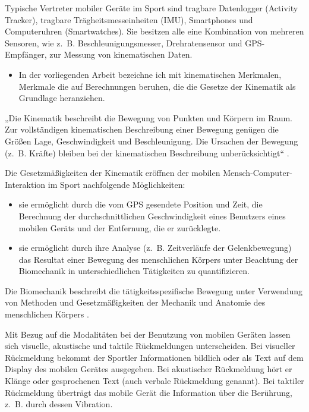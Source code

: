 Typische Vertreter mobiler Geräte im Sport sind tragbare Datenlogger (Activity Tracker), tragbare Trägheitsmesseinheiten (\ac{IMU}), Smartphones und Computeruhren (Smartwatches). Sie besitzen alle eine Kombination von mehreren Sensoren, wie z.~B. Beschleunigungsmesser, Drehratensensor und \ac{GPS}-Empfänger, zur Messung von kinematischen Daten. 
\begin{itemize}
	
	\item In der vorliegenden Arbeit bezeichne ich mit kinematischen Merkmalen, Merkmale die auf Berechnungen beruhen, die die Gesetze der Kinematik als Grundlage heranziehen.
\end{itemize}

„Die Kinematik beschreibt die Bewegung von Punkten und Körpern im Raum. Zur vollständigen kinematischen Beschreibung einer Bewegung genügen die Größen Lage, Geschwindigkeit und Beschleunigung. Die Ursachen der Bewegung (z.~B. Kräfte) bleiben bei der kinematischen Beschreibung unberücksichtigt“ \citep[][S.~57]{Disselhorst-Klug2015}.

Die Gesetzmäßigkeiten der Kinematik eröffnen der mobilen Mensch-Computer-Interaktion im Sport nachfolgende Möglichkeiten: 
\begin{itemize}
	\item sie ermöglicht durch die vom \ac{GPS} gesendete Position und Zeit, die Berechnung der durchschnittlichen Geschwindigkeit eines Benutzers eines mobilen Geräts und der Entfernung, die er zurücklegte. 
	\item sie ermöglicht durch ihre Analyse (z.~B. Zeitverläufe der Gelenkbewegung) das Resultat einer Bewegung des menschlichen Körpers unter Beachtung der Biomechanik in unterschiedlichen Tätigkeiten zu quantifizieren. 
\end{itemize}

Die Biomechanik beschreibt die tätigkeitsspezifische Bewegung unter Verwendung von Methoden und Gesetzmäßigkeiten der Mechanik und Anatomie des menschlichen Körpers \citep[][ S.~2~ff.]{Winter2009}.

Mit Bezug auf die Modalitäten bei der Benutzung von mobilen Geräten lassen sich visuelle, akustische und taktile Rückmeldungen unterscheiden. Bei visueller Rückmeldung bekommt der Sportler Informationen bildlich oder als Text auf dem Display des mobilen Gerätes ausgegeben. Bei akustischer Rückmeldung hört er Klänge oder gesprochenen Text (auch verbale Rückmeldung genannt). Bei taktiler Rückmeldung überträgt das mobile Gerät die Information über die Berührung, z.~B. durch dessen Vibration.

